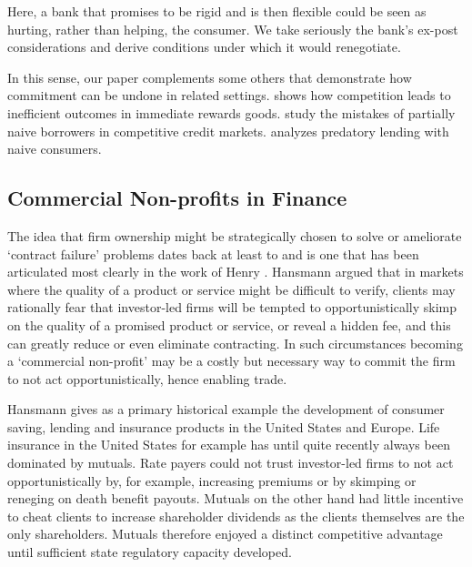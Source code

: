 \documentclass[11pt,english]{article}
\theoremstyle{plain}
\theoremstyle{definition}
\begin{document}
Here, a bank that promises to be rigid and is then flexible could
be seen as hurting, rather than helping, the consumer. We take seriously
the bank's ex-post considerations and derive conditions under which
it would renegotiate.

In this sense, our paper complements some others that demonstrate
how commitment can be undone in related settings. \citet{gottlieb2008}
shows how competition leads to inefficient outcomes in immediate rewards
goods. \citet{heidhues2010} study the mistakes of partially naive
borrowers in competitive credit markets. \citet{mendez2012} analyzes
predatory lending with naive consumers. 

\subsection{Commercial Non-profits in Finance}

The idea that firm ownership might be strategically chosen to solve
or ameliorate `contract failure' problems dates back at least to \citet{arrow1963}
and is one that has been articulated most clearly in the work of Henry
\citet{hansmann1996a}. Hansmann argued that in markets where the
quality of a product or service might be difficult to verify, clients
may rationally fear that investor-led firms will be tempted to opportunistically
skimp on the quality of a promised product or service, or reveal a
hidden fee, and this can greatly reduce or even eliminate contracting.
In such circumstances becoming a `commercial non-profit' may be a
costly but necessary way to commit the firm to not act opportunistically,
hence enabling trade.

Hansmann gives as a primary historical example the development of
consumer saving, lending and insurance products in the United States
and Europe. Life insurance in the United States for example has until
quite recently always been dominated by mutuals. Rate payers could
not trust investor-led firms to not act opportunistically by, for
example, increasing premiums or by skimping or reneging on death benefit
payouts. Mutuals on the other hand had little incentive to cheat clients
to increase shareholder dividends as the clients themselves are the
only shareholders. Mutuals therefore enjoyed a distinct competitive
advantage until sufficient state regulatory capacity developed.
\end{document}
